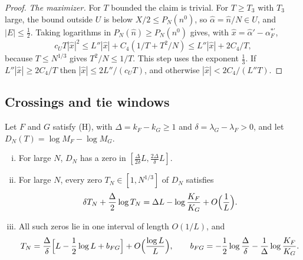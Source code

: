 \begin{proof}
\emph{The maximizer.} For $T$ bounded the claim is trivial. For $T\ge T_3$
with $T_3$ large, the bound outside $U$ is below $X/2\le P_N(n^0)$, so
$\hat\alpha=\hat n/N\in U$, and $|E|\le\frac12$. Taking logarithms in
$P_N(\hat n)\ge P_N(n^0)$ gives, with $\hat x=\hat\alpha'-\alpha^{*\prime}_F$,
\[
c_UT|\hat x|^2\le L''|\hat x|+C_4(1/T+T^2/N)\le L''|\hat x|+2C_4/T,
\]
because $T\le N^{1/3}$ gives $T^2/N\le1/T$. This step uses the exponent
$\frac13$. If $L''|\hat x|\ge2C_4/T$ then $|\hat x|\le2L''/(c_UT)$,
and otherwise $|\hat x|<2C_4/(L''T)$.
\end{proof}

\subsection{Crossings and tie windows}

\begin{theorem}\label{thm:crossing}
Let $F$ and $G$ satisfy (H), with $\Delta=k_F-k_G\ge1$ and
$\delta=\lambda_G-\lambda_F>0$, and let $D_N(T)=\log M_F-\log M_G$.
\begin{enumerate}[(i)]
\item For large $N$, $D_N$ has a zero in
$[\frac{\Delta}{2\delta}L,\frac{2\Delta}{\delta}L]$.
\item For large $N$, every zero $T_N\in[1,N^{1/3}]$ of $D_N$ satisfies
\begin{equation}\label{eq:crossing}
\delta T_N+\frac\Delta2\log T_N=\Delta L-\log\frac{K_F}{K_G}
+O\Bigl(\frac1L\Bigr).
\end{equation}
\item All such zeros lie in one interval of length $O(1/L)$, and
\[
T_N=\frac\Delta\delta\Bigl[L-\frac12\log L+b_{FG}\Bigr]
+O\Bigl(\frac{\log L}L\Bigr),\qquad
b_{FG}=-\frac12\log\frac\Delta\delta-\frac1\Delta\log\frac{K_F}{K_G}.
\]
\end{enumerate}
\end{theorem}

